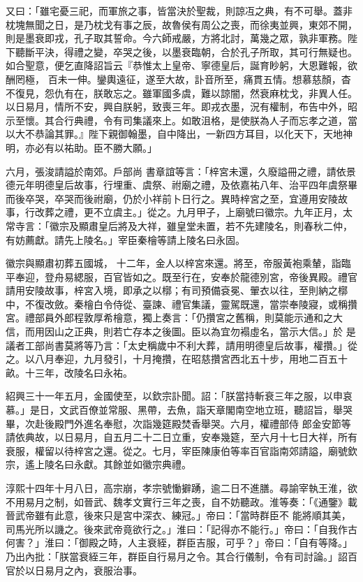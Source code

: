 \begin{pinyinscope}
 又曰：「雖宅憂三祀，而軍旅之事，皆當決於聖裁，則諒冱之典，有不可舉。蓋非枕塊無聞之日，是乃枕戈有事之辰，故魯侯有周公之喪，而徐夷並興，東郊不開，則是墨衰即戎，孔子取其誓命。今六師戒嚴，方將北討，萬幾之眾，孰非軍務。陛下聽斷平決，得禮之變，卒哭之後，以墨衰臨朝，合於孔子所取，其可行無疑也。如合聖意，便乞直降詔旨云『恭惟太上皇帝、寧德皇后，誕育眇躬，大恩難報，欲酬罔極，
 百未一伸。鑾輿遠征，遂至大故，訃音所至，痛貫五情。想慕慈顏，杳不復見，怨仇有在，朕敢忘之。雖軍國多虞，難以諒闇，然衰麻枕戈，非異人任。以日易月，情所不安，興自朕躬，致喪三年。即戎衣墨，況有權制，布告中外，昭示至懷。其合行典禮，令有司集議來上。如敢沮格，是使朕為人子而忘孝之道，當以大不恭論其罪。』陛下親御翰墨，自中降出，一新四方耳目，以化天下，天地神明，亦必有以祐助。臣不勝大願。」



 六月，張浚請謚於南郊。戶部尚
 書章誼等言：「梓宮未還，久廢謚冊之禮，請依景德元年明德皇后故事，行埋重、虞祭、祔廟之禮，及依嘉祐八年、治平四年虞祭畢而後卒哭，卒哭而後祔廟，仍於小祥前卜日行之。異時梓宮之至，宜遵用安陵故事，行改葬之禮，更不立虞主。」從之。九月甲子，上廟號曰徽宗。九年正月，太常寺言：「徽宗及顯肅皇后將及大祥，雖皇堂未置，若不先建陵名，則春秋二仲，有妨薦獻。請先上陵名。」宰臣秦檜等請上陵名曰永固。



 徽宗與顯肅初葬五國城，
 十二年，金人以梓宮來還。將至，帝服黃袍乘輦，詣臨平奉迎，登舟易緦服，百官皆如之。既至行在，安奉於龍德別宮，帝後異殿。禮官請用安陵故事，梓宮入境，即承之以槨；有司預備袞冕、翬衣以往，至則納之槨中，不復改斂。秦檜白令侍從、臺諫、禮官集議，靈駕既還，當崇奉陵寢，或稱攢宮。禮部員外郎程敦厚希檜意，獨上奏言：「仍攢宮之舊稱，則莫能示通和之大信，而用因山之正典，則若亡存本之後圖。臣以為宜勿褟虛名，當示大信。」於
 是議者工部尚書莫將等乃言：「太史稱歲中不利大葬，請用明德皇后故事，權攢。」從之。以八月奉迎，九月發引，十月掩攢，在昭慈攢宮西北五十步，用地二百五十畝。十三年，改陵名曰永祐。



 紹興三十一年五月，金國使至，以欽宗訃聞。詔：「朕當持斬衰三年之服，以申哀慕。」是日，文武百僚並常服、黑帶，去魚，詣天章閣南空地立班，聽詔旨，舉哭畢，次赴後殿門外進名奉慰，次詣幾筵殿焚香舉哭。六月，權禮部侍
 郎金安節等請依典故，以日易月，自五月二十二日立重，安奉幾筵，至六月十七日大祥，所有衰服，權留以待梓宮之還。從之。七月，宰臣陳康伯等率百官詣南郊請謚，廟號欽宗，遙上陵名曰永獻。其餘並如徽宗典禮。



 淳熙十四年十月八日，高宗崩，孝宗號慟擗踴，逾二日不進膳。尋諭宰執王淮，欲不用易月之制，如晉武、魏孝文實行三年之喪，自不妨聽政。淮等奏：「《通鑒》載晉武帝雖有此意，後來只是宮中深衣、練冠。」帝曰：「當時群臣不
 能將順其美，司馬光所以譏之。後來武帝竟欲行之。」淮曰：「記得亦不能行。」帝曰：「自我作古何害？」淮曰：「御殿之時，人主衰絰，群臣吉服，可乎？」帝曰：「自有等降。」乃出內批：「朕當衰絰三年，群臣自行易月之令。其合行儀制，令有司討論。」詔百官於以日易月之內，衰服治事。




\end{pinyinscope}

